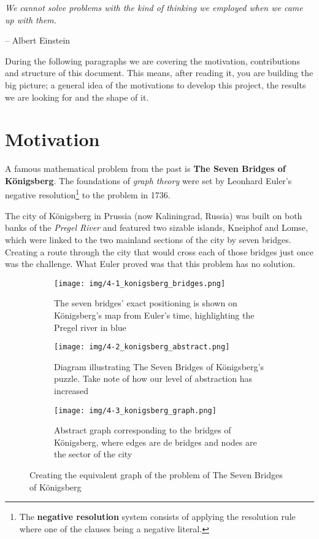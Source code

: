 \epigraph{\textit{We cannot solve problems with the kind of thinking we employed when we came up with them.}}{-- \textup{Albert Einstein}}

During the following paragraphs we are covering the motivation, contributions and structure of this document. This means, after reading it, you are building the big picture; a general idea of the motivations to develop this project, the results we are looking for and the shape of it.

\section{Motivation}

A famous mathematical problem from the past is \textbf{The Seven Bridges of Königsberg}. The foundations of \textit{graph theory} were set by Leonhard Euler's negative resolution\footnote{The \textbf{negative resolution} system consists of applying the resolution rule where one of the clauses being a negative literal.} to the problem in 1736.

The city of Königsberg in Prussia (now Kaliningrad, Russia) was built on both banks of the \textit{Pregel River} and featured two sizable islands, Kneiphof and Lomse, which were linked to the two mainland sections of the city by seven bridges. Creating a route through the city that would cross each of those bridges just once was the challenge. What Euler proved was that this problem has no solution.

\begin{figure}[ht]
    \begin{subfigure}{.3\textwidth}
        \centering
        \texttt{[image: img/4-1\_konigsberg\_bridges.png]}
        \caption{The seven bridges' exact positioning is shown on Königsberg's map from Euler's time, highlighting the Pregel river in blue}
    \end{subfigure}%
    \hspace*{0.5em}
    \begin{subfigure}{.3\textwidth}
        \centering
        \texttt{[image: img/4-2\_konigsberg\_abstract.png]}
        \caption{Diagram illustrating The Seven Bridges of Königsberg's puzzle. Take note of how our level of abstraction has increased}
    \end{subfigure}%
    \hspace*{0.5em}
    \begin{subfigure}{.3\textwidth}
        \centering
        \texttt{[image: img/4-3\_konigsberg\_graph.png]}
        \caption{Abstract graph corresponding to the bridges of Königsberg, where edges are de bridges and nodes are the sector of the city}
    \end{subfigure}%
    \caption[Creating the equivalent graph of the problem of The Seven Bridges of Königsberg]{Creating the equivalent graph of the problem of The Seven Bridges of Königsberg\footnotemark}
\end{figure}

